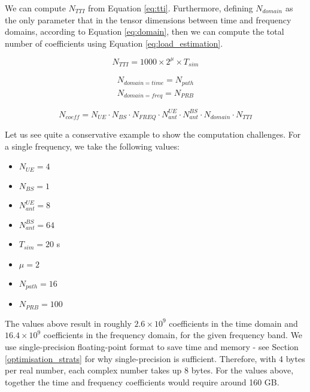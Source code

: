 We can compute $N_{TTI}$ from Equation \eqref{eq:tti}. Furthermore, defining $N_{domain}$ as the only parameter that in the tensor dimensions between time and frequency domains, according to Equation \eqref{eq:domain}, then we can compute the total number of coefficients using Equation \eqref{eq:load_estimation}.

\begin{equation} \label{eq:tti}
    N_{TTI} = 1000 \times 2^\mu \times T_{sim}
\end{equation}

\begin{align} \label{eq:domain}
    N_{domain=time} = N_{path} \\
    N_{domain=freq} = N_{PRB}
\end{align}

\begin{equation} \label{eq:load_estimation}
    N_{coeff} = N_{UE} \cdot N_{BS} \cdot N_{FREQ} \cdot N_{ant}^{UE} \cdot N_{ant}^{BS} \cdot N_{domain} \cdot N_{TTI} 
\end{equation}

Let us see quite a conservative example to show the computation challenges. For a single frequency, we take the following values:

\begin{multicols}{4}
    \begin{itemize}
        \item $N_{UE} = 4$
        \item $N_{BS} = 1$
        \item $N_{ant}^{UE} = 8$
        \item $N_{ant}^{BS} = 64$
        \item $T_{sim} = 20 $ s
        \item $\mu = 2$ 
        \item $N_{path} = 16$
        \item $N_{PRB} = 100$
    \end{itemize}
\end{multicols}

The values above result in roughly $2.6 \times 10^9$ coefficients in the time domain and $16.4 \times 10^9$ coefficients in the frequency domain, for the given frequency band. We use single-precision floating-point format to save time and memory - see Section \ref{optimisation_strats} for why single-precision is sufficient. Therefore, with 4 bytes per real number, each complex number takes up 8 bytes. For the values above, together the time and frequency coefficients would require around 160 GB. 

